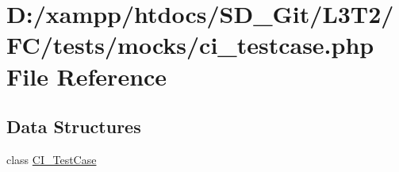 \hypertarget{ci__testcase_8php}{}\section{D\+:/xampp/htdocs/\+S\+D\+\_\+\+Git/\+L3\+T2/\+F\+C/tests/mocks/ci\+\_\+testcase.php File Reference}
\label{ci__testcase_8php}
\subsection*{Data Structures}
\begin{DoxyCompactItemize}
\item 
class \hyperlink{class_c_i___test_case}{C\+I\+\_\+\+Test\+Case}
\end{DoxyCompactItemize}
